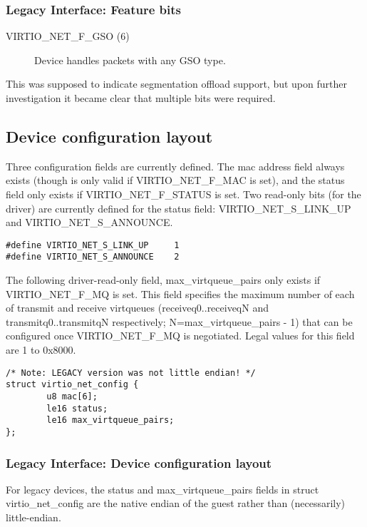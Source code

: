 \subsubsection{Legacy Interface: Feature bits}\label{sec:Device Types / Network Device / Feature bits / Legacy Interface: Feature bits}
\begin{description}
\item[VIRTIO_NET_F_GSO (6)] Device handles packets with any GSO type.
\end{description}

This was supposed to indicate segmentation offload support, but
upon further investigation it became clear that multiple bits
were required.

\subsection{Device configuration layout}\label{sec:Device Types / Network Device / Device configuration layout}

Three configuration fields are currently defined. The mac address field
always exists (though is only valid if VIRTIO_NET_F_MAC is set), and
the status field only exists if VIRTIO_NET_F_STATUS is set. Two
read-only bits (for the driver) are currently defined for the status field:
VIRTIO_NET_S_LINK_UP and VIRTIO_NET_S_ANNOUNCE.

\begin{lstlisting}
#define VIRTIO_NET_S_LINK_UP     1
#define VIRTIO_NET_S_ANNOUNCE    2
\end{lstlisting}

The following driver-read-only field, max_virtqueue_pairs only exists if
VIRTIO_NET_F_MQ is set. This field specifies the maximum number
of each of transmit and receive virtqueues (receiveq0..receiveqN
and transmitq0..transmitqN respectively;
 N=max_virtqueue_pairs - 1) that can be configured once VIRTIO_NET_F_MQ
is negotiated.  Legal values for this field are 1 to 0x8000.

\begin{lstlisting}
/* Note: LEGACY version was not little endian! */
struct virtio_net_config {
        u8 mac[6];
        le16 status;
        le16 max_virtqueue_pairs;
};
\end{lstlisting}

\subsubsection{Legacy Interface: Device configuration layout}\label{sec:Device Types / Network Device / Device configuration layout / Legacy Interface: Device configuration layout}
For legacy devices, the status and max_virtqueue_pairs fields in struct virtio_net_config are the
native endian of the guest rather than (necessarily) little-endian.


